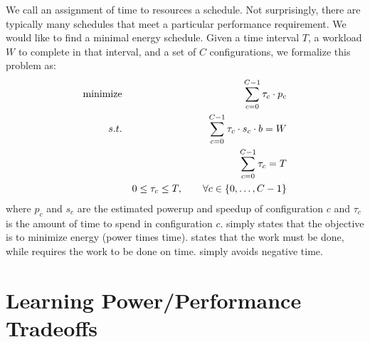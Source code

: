 We call an assignment of time to resources a schedule.  Not
surprisingly, there are typically many schedules that meet a
particular performance requirement.  We would like to find a minimal
energy schedule. Given a time interval $T$, a workload $W$ to
complete in that interval, and a set of $C$ configurations, we
formalize this problem as:
\begin{eqnarray}
  \minimize && \sum_{c=0}^{C-1} \tau_c \cdot p_c \label{eqn:power} \\
  \st %
  && \sum_{c=0}^{C-1} \tau_c \cdot s_c \cdot b =  W \label{eqn:work} \\
  && \sum_{c=0}^{C-1} \tau_c =  T \label{eqn:deadline} \\
  && 0 \le \tau_c \le T, \qquad \forall c \in \{0,\ldots,C-1\} \label{eqn:time}
\end{eqnarray}
where $p_c$ and $s_c$ are the estimated powerup and speedup of
configuration $c$ and $\tau_c$ is the amount of time to spend in
configuration $c$.   simply states that the objective is
to minimize energy (power times time).   states that the
work must be done, while  requires the work to be
done on time.   simply avoids negative time.  


\section{Learning Power/Performance Tradeoffs}

